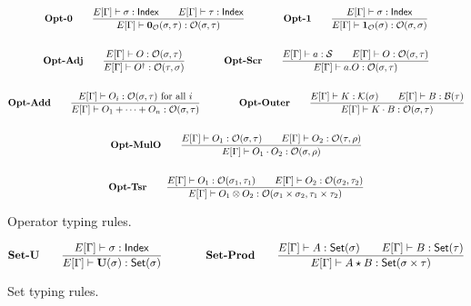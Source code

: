 \documentclass{article}
\begin{document}
\begin{figure}[h]
    \begin{gather*}
        \textbf{Opt-0} \qquad
        \frac{E[\Gamma] \vdash \sigma : \mathsf{Index} \qquad E[\Gamma] \vdash \tau : \mathsf{Index}}{E[\Gamma] \vdash \mathbf{0}_\mathcal{O}(\sigma, \tau) : \mathcal{O}(\sigma, \tau)} 
        \qquad \qquad
        \textbf{Opt-1} \qquad
        \frac{E[\Gamma] \vdash \sigma : \mathsf{Index}}{E[\Gamma] \vdash \mathbf{1}_\mathcal{O}(\sigma) : \mathcal{O}(\sigma, \sigma)} \\
        \\
        \textbf{Opt-Adj} \qquad
        \frac{E[\Gamma] \vdash O : \mathcal{O}(\sigma, \tau)}{E[\Gamma] \vdash O^\dagger : \mathcal{O}(\tau, \sigma)} 
        \qquad \qquad
        \textbf{Opt-Scr} \qquad
        \frac{E[\Gamma] \vdash a : \mathcal{S} \qquad E[\Gamma] \vdash O : \mathcal{O}(\sigma, \tau)}{E[\Gamma] \vdash a.O : \mathcal{O}(\sigma, \tau)} \\
        \\
        \textbf{Opt-Add} \qquad
        \frac{E[\Gamma] \vdash O_i : \mathcal{O}(\sigma, \tau) \text{ for all $i$}}{E[\Gamma] \vdash O_1 + \cdots + O_n : \mathcal{O}(\sigma, \tau)}
        \qquad \qquad
        \textbf{Opt-Outer} \qquad
        \frac{E[\Gamma]\vdash K : \mathcal{K}(\sigma) \qquad E[\Gamma]\vdash B : \mathcal{B}(\tau)}{E[\Gamma]\vdash K \cdot B : \mathcal{O}(\sigma, \tau)} \\
        \\
        \textbf{Opt-MulO} \qquad
        \frac{E[\Gamma] \vdash O_1 : \mathcal{O}(\sigma, \tau) \qquad E[\Gamma] \vdash O_2 : \mathcal{O}(\tau, \rho)}{E[\Gamma] \vdash O_1 \cdot O_2 : \mathcal{O}(\sigma, \rho)} \\
        \\
        \textbf{Opt-Tsr} \qquad
        \frac{E[\Gamma] \vdash O_1 : \mathcal{O}(\sigma_1, \tau_1) \qquad E[\Gamma] \vdash O_2 : \mathcal{O}(\sigma_2, \tau_2)} {E[\Gamma] \vdash O_1 \otimes O_2 : \mathcal{O}(\sigma_1 \times \sigma_2, \tau_1 \times \tau_2)}
    \end{gather*}
    \caption{Operator typing rules.}
\end{figure}


\begin{figure}[h]
    \begin{gather*}
        \textbf{Set-U} \qquad
        \frac{E[\Gamma] \vdash \sigma : \mathsf{Index}}{E[\Gamma] \vdash \mathbf{U}(\sigma) : \mathsf{Set}(\sigma)} 
        \qquad \qquad
        \textbf{Set-Prod} \qquad
        \frac{E[\Gamma] \vdash A : \mathsf{Set}(\sigma) \qquad E[\Gamma] \vdash B : \mathsf{Set}(\tau)}{E[\Gamma] \vdash A \star B : \mathsf{Set}(\sigma \times \tau)}
    \end{gather*}
    \caption{Set typing rules.}
\end{figure}
\end{document}
